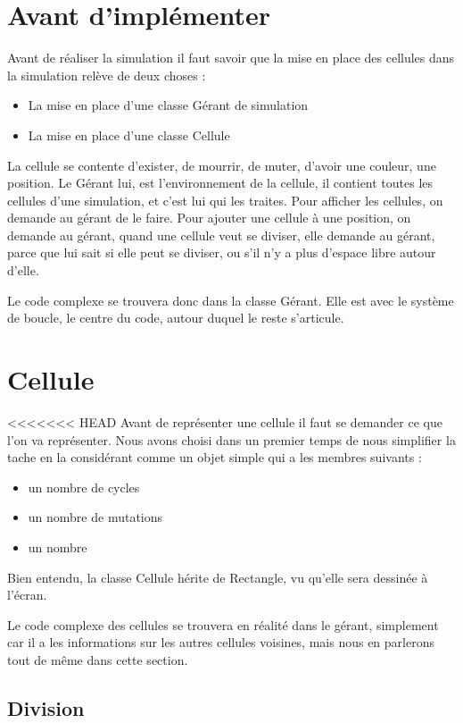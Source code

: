 \section{Avant d'implémenter}
Avant de réaliser la simulation il faut savoir que 
la mise en place des cellules dans la simulation relève de deux choses : 
\begin{itemize}
	\item La mise en place d'une classe Gérant de simulation
	\item La mise en place d'une classe Cellule
\end{itemize}

La cellule se contente d'exister, de mourrir, de muter, d'avoir une couleur, une position. Le Gérant lui, est l'environnement de la cellule, il contient toutes les cellules d'une simulation, et c'est lui qui les traites. Pour afficher les cellules, on demande au gérant de le faire. Pour ajouter une cellule à une position, on demande au gérant, quand une cellule veut se diviser, elle demande au gérant, parce que lui sait si elle peut se diviser, ou s'il n'y a plus d'espace libre autour d'elle.

Le code complexe se trouvera donc dans la classe Gérant. Elle est avec le système de boucle, le centre du code, autour duquel le reste s'articule.

\section{Cellule}
<<<<<<< HEAD
Avant de représenter une cellule il faut se demander ce que l'on va représenter. Nous avons choisi dans un premier temps de nous simplifier la tache en la considérant comme un objet simple qui a les membres suivants : 
\begin{itemize}
	\item un nombre de cycles
	\item un nombre de mutations
	\item un nombre 
\end{itemize}

Bien entendu, la classe Cellule hérite de Rectangle, vu qu'elle sera dessinée à l'écran.

Le code complexe des cellules se trouvera en réalité dans le gérant, simplement car il a les informations sur les autres cellules voisines, mais nous en parlerons tout de même dans cette section.

\subsection{Division}

